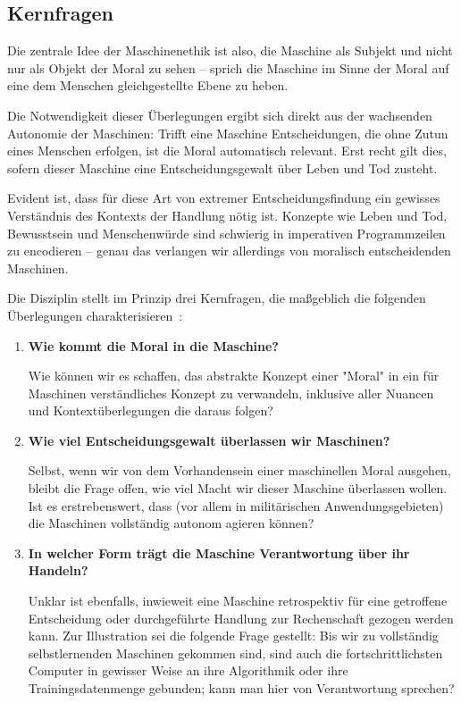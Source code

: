\documentclass[twocolumn, german]{tum-article}
\begin{document}
\subsection{Kernfragen}
\label{sec:questions}
Die zentrale Idee der Maschinenethik ist also, die Maschine als Subjekt und nicht nur als Objekt der Moral zu sehen -- sprich die Maschine im Sinne der Moral auf eine dem Menschen gleichgestellte Ebene zu heben.

Die Notwendigkeit dieser Überlegungen ergibt sich direkt aus der wachsenden Autonomie der Maschinen:
Trifft eine Maschine Entscheidungen, die ohne Zutun eines Menschen erfolgen, ist die Moral automatisch relevant.
Erst recht gilt dies, sofern dieser Maschine eine Entscheidungsgewalt über Leben und Tod zusteht.

Evident ist, dass für diese Art von extremer Entscheidungsfindung ein gewisses Verständnis des Kontexts der Handlung nötig ist.
Konzepte wie Leben und Tod, Bewusstsein und Menschenwürde sind schwierig in imperativen Programmzeilen zu encodieren -- genau das verlangen wir allerdings von moralisch entscheidenden Maschinen.

Die Disziplin stellt im Prinzip drei Kernfragen, die maßgeblich die folgenden Überlegungen charakterisieren~\cite[S. 13ff.]{bendel-mascheth}:
\begin{enumerate}
	\item \textbf{Wie kommt die Moral in die Maschine?}
	\nopagebreak
	
	Wie können wir es schaffen, das abstrakte Konzept einer "Moral" in ein für Maschinen verständliches Konzept zu verwandeln, inklusive aller Nuancen und Kontextüberlegungen die daraus folgen?
	
	
	\item \textbf{Wie viel Entscheidungsgewalt überlassen wir Maschinen?}
	\nopagebreak
	
	Selbst, wenn wir von dem Vorhandensein einer maschinellen Moral ausgehen, bleibt die Frage offen, wie viel Macht wir dieser Maschine überlassen wollen.
	Ist es erstrebenswert, dass (vor allem in militärischen Anwendungsgebieten) die Maschinen vollständig autonom agieren können?
	
	
	\item \textbf{In welcher Form trägt die Maschine Verantwortung über ihr Handeln?}
	\nopagebreak
	
	Unklar ist ebenfalls, inwieweit eine Maschine retrospektiv für eine getroffene Entscheidung oder durchgeführte Handlung zur Rechenschaft gezogen werden kann.
	Zur Illustration sei die folgende Frage gestellt: Bis wir zu vollständig selbstlernenden Maschinen gekommen sind, sind auch die fortschrittlichsten Computer in gewisser Weise an ihre Algorithmik oder ihre Trainingsdatenmenge gebunden; kann man hier von Verantwortung sprechen?
\end{enumerate}
\end{document}
